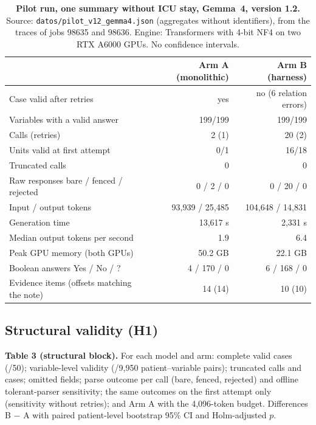 \begin{table}[tbp]
\centering\small
\caption{\textbf{Pilot run, one summary without ICU stay, Gemma~4, version 1.2.} Source:
\texttt{datos/pilot\_v12\_gemma4.json} (aggregates without identifiers), from the traces of jobs 98635 and 98636.
Engine: Transformers with 4-bit NF4 on two RTX A6000 GPUs. No confidence intervals.}
\label{tab:pilot}
\begin{tabular}{lrr}
\toprule
 & Arm A (monolithic) & Arm B (harness) \\
\midrule
Case valid after retries & yes & no (6 relation errors) \\
Variables with a valid answer & 199/199 & 199/199 \\
Calls (retries) & 2 (1) & 20 (2) \\
Units valid at first attempt & 0/1 & 16/18 \\
Truncated calls & 0 & 0 \\
Raw responses bare / fenced / rejected & 0 / 2 / 0 & 0 / 20 / 0 \\
Input / output tokens & 93{,}939 / 25{,}485 & 104{,}648 / 14{,}831 \\
Generation time & 13{,}617 s & 2{,}331 s \\
Median output tokens per second & 1.9 & 6.4 \\
Peak GPU memory (both GPUs) & 50.2 GB & 22.1 GB \\
Boolean answers Yes / No / ? & 4 / 170 / 0 & 6 / 168 / 0 \\
Evidence items (offsets matching the note) & 14 (14) & 10 (10) \\
\bottomrule
\end{tabular}
\end{table}

\subsection{Structural validity (H1)}

\begin{resultspending}
\textbf{Table 3 (structural block).} For each model and arm: complete valid cases (/50); variable-level validity
(/9{,}950 patient--variable pairs); truncated calls and cases; omitted fields; parse outcome per call (bare, fenced, rejected) and offline
tolerant-parser sensitivity; the same outcomes on the first attempt only (sensitivity without retries); and Arm A with the
4{,}096-token budget. Differences B $-$ A with paired patient-level bootstrap 95\% CI and Holm-adjusted $p$.
\end{resultspending}

